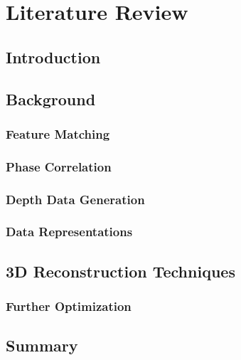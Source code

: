
\makeatletter
\chapter{Literature Review}
\label{ch:TheLiteratureReviewChapter}

\section{Introduction}


\section{Background}
\label{Sec:LitRevBackgroundX}

\subsection{Feature Matching}
\label{sec:LitRevFeatureMatching11}


\subsection{Phase Correlation}
\label{Sec:SuperficialPCSection}


\subsection{Depth Data Generation}
\label{DepthDataGenSection}



\subsection{Data Representations}
\label{sec:LitRevDataRepresentation}


\section{3D Reconstruction Techniques}
\label{sec:LitRevReconstructionTechniques}

\subsection{Further Optimization}


\section{Summary}

